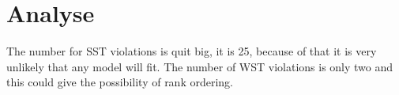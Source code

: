 \section*{Analyse}
\label{Analyse}
%
The number for SST violations is quit big, it is 25, because of that it is very unlikely that any model will fit. The number of WST violations is only two and this could give the possibility of rank ordering. 


